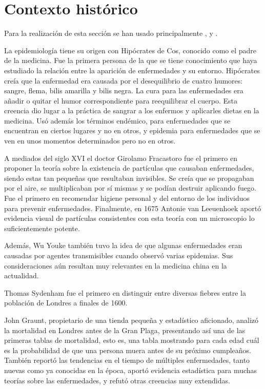 \section*{Contexto histórico}

Para la realización de esta sección se han usado principalmente \cite{Byrne2012-ej}, \cite{Merril2010-nm} y \cite{Johnson2011-di}.

La epidemiología tiene su origen con Hipócrates de Cos, conocido como el padre de la medicina. Fue la primera persona de la que se tiene conocimiento que haya estudiado la relación entre la aparición de enfermedades y su entorno. Hipócrates creía que la enfermedad era causada por el desequilibrio de cuatro humores: sangre, flema, bilis amarilla y bilis negra. La cura para las enfermedades era añadir o quitar el humor correspondiente para reequilibrar el cuerpo. Esta creencia dio lugar a la práctica de sangrar a los enfermos y aplicarles dietas en la medicina. Usó además los términos endémico, para enfermedades que se encuentran en ciertos lugares y no en otros, y epidemia para enfermedades que se ven en unos momentos determinados pero no en otros.

A mediados del siglo XVI el doctor Girolamo Fracastoro fue el primero en proponer la teoría sobre la existencia de partículas que causaban enfermedades, siendo estas tan pequeñas que resultaban invisibles. Se creía que se propagaban por el aire, se multiplicaban por sí mismas y se podían destruir aplicando fuego. Fue el primero en recomendar higiene personal y del entorno de los individuos para prevenir enfermedades. Finalmente, en 1675 Antonie van Leeuenhoek aportó evidencia visual de partículas consistentes con esta teoría con un microscopio lo suficientemente potente.

Además, Wu Youke también tuvo la idea de que algunas enfermedades eran causadas por agentes transmisibles cuando observó varias epidemias. Sus consideraciones aún resultan muy relevantes en la medicina china en la actualidad.

Thomas Sydenham fue el primero en distinguir entre diversas fiebres entre la población de Londres a finales de 1600.

John Graunt, propietario de una tienda pequeña y estadístico aficionado, analizó la mortalidad en Londres antes de la Gran Plaga, presentando así una de las primeras tablas de mortalidad, esto es, una tabla mostrando para cada edad cuál es la probabilidad de que una persona muera antes de su próximo cumpleaños. También reportó las tendencias en el tiempo de múltiples enfermedades, tanto nuevas como ya conocidas en la época, aportó evidencia estadística para muchas teorías sobre las enfermedades, y refutó otras creencias muy extendidas.

